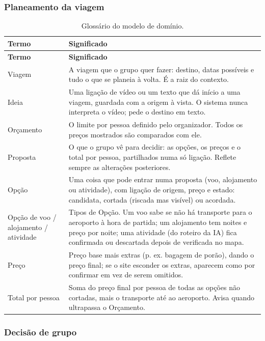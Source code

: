 \subsubsection{Planeamento da viagem}

\begin{longtable}{@{}p{4cm}p{11.3cm}@{}}
\caption{Glossário do modelo de domínio.}\label{tab:glossario-planeamento}\\
\toprule \textbf{Termo} & \textbf{Significado} \\ \midrule \endfirsthead
\toprule \textbf{Termo} & \textbf{Significado} \\ \midrule \endhead
Viagem & A viagem que o grupo quer fazer: destino, datas possíveis e tudo o que se planeia à volta. É a raiz do contexto.  \\
Ideia & Uma ligação de vídeo ou um texto que dá início a uma viagem, guardada com a origem à vista. O sistema nunca interpreta o vídeo; pede o destino em texto.  \\
Orçamento & O limite por pessoa definido pelo organizador. Todos os preços mostrados são comparados com ele.  \\
Proposta & O que o grupo vê para decidir: as opções, os preços e o total por pessoa, partilhados numa só ligação. Reflete sempre as alterações posteriores.  \\
Opção & Uma coisa que pode entrar numa proposta (voo, alojamento ou atividade), com ligação de origem, preço e estado: candidata, cortada (riscada mas visível) ou acordada.  \\
Opção de voo / alojamento / atividade & Tipos de Opção. Um voo sabe se não há transporte para o aeroporto à hora de partida; um alojamento tem noites e preço por noite; uma atividade (do roteiro da IA) fica confirmada ou descartada depois de verificada no mapa.  \\
Preço & Preço base mais extras (p. ex. bagagem de porão), dando o preço final; se o site esconder os extras, aparecem como \guillemotleft{}por confirmar\guillemotright{} em vez de serem omitidos.  \\
Total por pessoa & Soma do preço final por pessoa de todas as opções não cortadas, mais o transporte até ao aeroporto. Avisa quando ultrapassa o Orçamento.  \\
\bottomrule
\end{longtable}

\subsubsection{Decisão de grupo}

